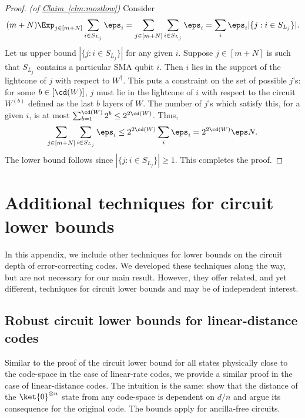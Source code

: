 \documentclass[11pt]{article}
\newcommand{\expref}[2]{\texorpdfstring{\hyperref[#2]{#1~\ref{#2}}}{#1~\ref{#2}}}
\begin{document}
\begin{proof}\textit{(of \expref{Claim}{clm:mostlow})}
Consider
\begin{align}(m+N)\Exp_{j\in [m+N]}\sum_{i\in S_{L_j}}\eps_i=\sum_{j\in [m+N]}\sum_{i\in S_{L_j}}\eps_i=\sum_{i}\eps_i|\{j:i\in S_{L_j}\}|.\end{align}
Let us upper bound $|\{j:i\in S_{L_j}\}|$ for any given $i$. Suppose $j\in [m+N]$ is such that $S_{L_j}$ contains a particular SMA qubit $i$. Then $i$ lies in the support of the lightcone of $j$ with respect to $W^{\dagger}$. This puts a constraint on the set of possible $j$'s: for some $b \in [\cd(W)]$, $j$ must lie in the lightcone of $i$ with respect to the circuit $W^{(b)}$ defined as the last $b$ layers of $W$. The number of $j$'s which satisfy this, for a given $i$, is at most $\sum_{b=1}^{\cd(W)}2^{b}\leq 2^{2\cd(W)}$. Thus, 
\begin{align}\sum_{j\in [m+N]}\sum_{i\in S_{L_j}}\eps_i\leq 2^{2\cd(W)}\sum_{i}\eps_i=2^{2\cd(W)}\eps N.\end{align}
The lower bound follows since $|\{j:i\in S_{L_j}\}|\geq 1$. This completes the proof.
\end{proof}

%

\appendix


\section{Additional techniques for circuit lower bounds}
\label{sec:other-techniques}

In this appendix, we include other techniques for lower bounds on the circuit depth of error-correcting codes. We developed these techniques along the way, but are not necessary for our main result. However, they offer related, and yet different, techniques for circuit lower bounds and may be of independent interest.

\subsection{Robust circuit lower bounds for linear-distance codes}

%

Similar to the proof of the circuit lower bound for all states physically close to the code-space in the case of linear-rate codes, we provide a similar proof in the case of linear-distance codes. The intuition is the same: show that the distance of the $\ket{0}^{\otimes n}$ state from any code-space is dependent on $d/n$ and argue its consequence for the original code. The bounds apply for ancilla-free circuits.
%
\end{document}
